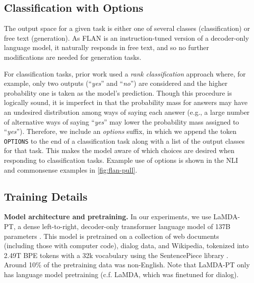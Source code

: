 \documentclass{article} %
\newcommand{\textttsmall}[1]{\texttt{{\small#1}}}
\newcommand{\flan}{FLAN}
\newcommand{\baselm}{LaMDA-PT}
\begin{document}
\subsection{Classification with Options}\label{subsec:options}
\vspace{-1mm}
The output space for a given task is either one of several classes (classification) or free text (generation). 
As \flan{} is an instruction-tuned version of a decoder-only language model, it naturally responds in free text, and so no further modifications are needed for generation tasks.

For classification tasks, prior work \citep{brown2020language} used a \textit{rank classification} approach where, for example, only two outputs (``\textit{yes}'' and ``\textit{no}'') are considered and the higher probability one is taken as the model's prediction.
Though this procedure is logically sound, it is imperfect in that the probability mass for answers may have an undesired distribution among ways of saying each answer (e.g., a large number of alternative ways of saying ``\textit{yes}'' may lower the probability mass assigned to ``\textit{yes}'').
Therefore, we include an \textit{options} suffix, in which we append the token \textttsmall{OPTIONS} to the end of a classification task along with a list of the output classes for that task.
This makes the model aware of which choices are desired when responding to classification tasks.
Example use of options is shown in the NLI and commonsense examples in \cref{fig:flan-pull}.

\vspace{-1mm}
\subsection{Training Details}
\vspace{-1mm}

\textbf{Model architecture and pretraining.} 
In our experiments, we use \baselm{}, a dense left-to-right, decoder-only transformer language model of 137B parameters \citep{thoppilan2022lamda}.
This model is pretrained on a collection of web documents (including those with computer code), dialog data, and Wikipedia, tokenized into 2.49T BPE tokens with a 32k vocabulary using the SentencePiece library \citep{sentencepiece}. 
Around 10\% of the pretraining data was non-English.
Note that \baselm{} only has language model pretraining (c.f. LaMDA, which was finetuned for dialog).
\end{document}
